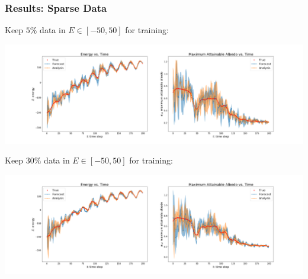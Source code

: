 \documentclass{beamer}
\begin{document}
\begin{frame}
\frametitle{Results: Sparse Data}
{\setlength{\baselineskip}{0.001em}
\tiny{Keep $5\%$ data in $E\in[-50,50]$ for training:}
\begin{center}
\includegraphics[width=0.85\linewidth]{Figures/H_sparse_new.png} 
\end{center}
\tiny{Keep $30\%$ data in $E\in[-50,50]$ for training:}
\begin{center}
\includegraphics[width=0.85\linewidth]{Figures/H_sparse_05_new.png} 
\end{center}
}
\end{frame}
\end{document}
